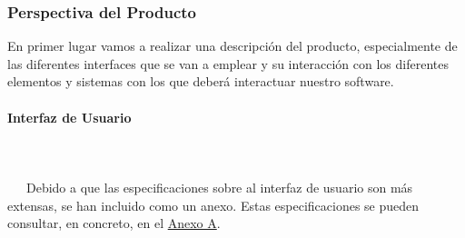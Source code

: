 \subsubsection{Perspectiva del Producto}
En primer lugar vamos a realizar una descripción del producto, especialmente de las diferentes interfaces que se van a emplear y su interacción con los diferentes elementos y sistemas con los que deberá interactuar nuestro software.

\paragraph{Interfaz de Usuario}
~\\\\
\-\ \-\ \-\ Debido a que las especificaciones sobre al interfaz de usuario son más extensas, se han incluido como un anexo. Estas especificaciones se pueden consultar, en concreto, en el \hyperref[sec:apenA]{Anexo A}.

\newpage

\appendix

